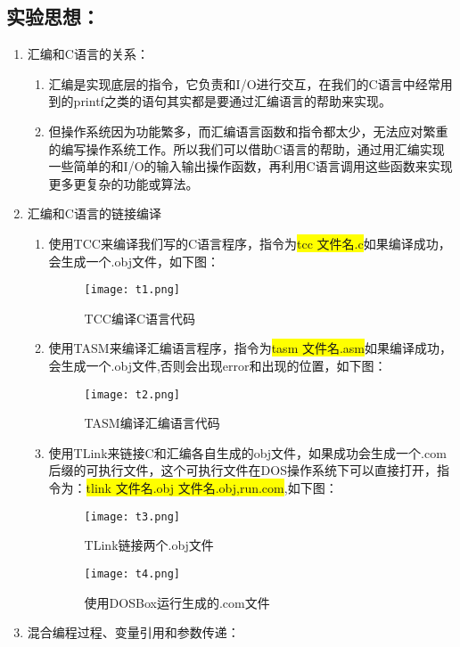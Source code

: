 \documentclass[UTF8]{article}
\begin{document}
\subsection{实验思想：}
\begin{enumerate}[1)]
\heiti
	\item 汇编和C语言的关系：
		\begin{enumerate}[i]
		\heiti \setlength{\itemsep}{0.2ex}
			\item 汇编是实现底层的指令，它负责和I/O进行交互，在我们的C语言中经常用到的printf之类的语句其实都是要通过汇编语言的帮助来实现。
			\item 但操作系统因为功能繁多，而汇编语言函数和指令都太少，无法应对繁重的编写操作系统工作。所以我们可以借助C语言的帮助，通过用汇编实现一些简单的和I/O的输入输出操作函数，再利用C语言调用这些函数来实现更多更复杂的功能或算法。
		\end{enumerate}
	\item 汇编和C语言的链接编译
		\begin{enumerate}[i]
		\heiti \setlength{\itemsep}{0.2ex}
			\item 使用TCC来编译我们写的C语言程序，指令为{\colorbox{yellow}{tcc 文件名.c}}如果编译成功，会生成一个.obj文件，如下图：
			\begin{figure}[htbp]
				\centering
				\texttt{[image: t1.png]}
				\caption{TCC编译C语言代码}
			\end{figure}
			\item 使用TASM来编译汇编语言程序，指令为{\colorbox{yellow}{tasm 文件名.asm}}如果编译成功，会生成一个.obj文件,否则会出现error和出现的位置，如下图：
			\begin{figure}[htbp]
				\centering
				\texttt{[image: t2.png]}
				\caption{TASM编译汇编语言代码}
			\end{figure}
			\item 使用TLink来链接C和汇编各自生成的obj文件，如果成功会生成一个.com后缀的可执行文件，这个可执行文件在DOS操作系统下可以直接打开，指令为：{\colorbox{yellow}{tlink 文件名.obj 文件名.obj,run.com}},如下图：
			\begin{figure}[htbp]
				\centering
				\texttt{[image: t3.png]}
				\caption{TLink链接两个.obj文件}
				\vspace{0.4cm}
				\texttt{[image: t4.png]}
				\caption{使用DOSBox运行生成的.com文件}
			\end{figure}
		\end{enumerate}
	\item 混合编程过程、变量引用和参数传递：
		\begin{enumerate}[i]

\end{enumerate}
\end{enumerate}
\end{document}
